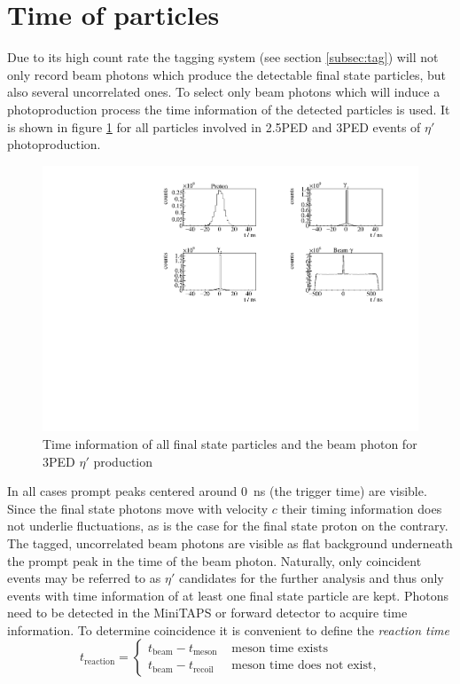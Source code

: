 \section{Time of particles}
Due to its high count rate the tagging system (see section \ref{subsec:tag}) will not only record beam photons which produce the detectable final state particles, but also several uncorrelated ones. To select only beam photons which will induce a photoproduction process the time information of the detected particles is used. It is shown in figure \ref{fig:time} for all particles involved in 2.5PED and 3PED events of $\eta'$ photoproduction. 
\begin{figure}[htbp]
	\centering
	\includegraphics[width=\linewidth]{../figs/hydrogen/time/times.pdf}
	\caption{Time information of all final state particles and the beam photon for 3PED $\eta'$ production}
	\label{fig:time}
\end{figure} 
In all cases prompt peaks centered around \SI{0}{\nano\s} (the trigger time) are visible. Since the final state photons move with velocity $c$ their timing information does not underlie fluctuations, as is the case for the final state proton on the contrary. The tagged, uncorrelated beam photons are visible as flat background underneath the prompt peak in the time of the beam photon. Naturally, only coincident events may be referred to  as $\eta'$ candidates for the further analysis and thus only events with time information of at least one final state particle are kept. Photons need to be detected in the MiniTAPS or forward
detector to acquire time information. To determine coincidence it is convenient to define the \emph{reaction time} 
\begin{equation}
	t_\text{reaction}=\begin{cases}
		t_\text{beam}-t_\text{meson} & \text{ meson time exists}\\
		t_\text{beam}-t_\text{recoil} & \text{ meson time does not exist},
	\end{cases}
\end{equation}
